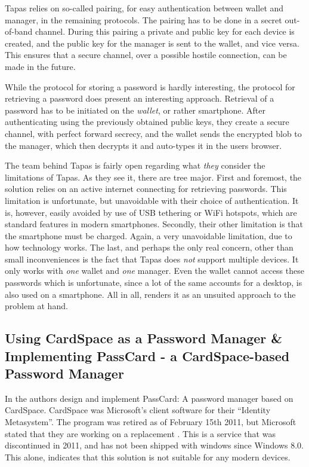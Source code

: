 			Tapas relies on so-called pairing, for easy authentication between wallet and manager, in the remaining protocols. The pairing has to be done in a secret out-of-band channel. During this pairing a private and public key for each device is created, and the public key for the manager is sent to the wallet, and vice versa. This ensures that a secure channel, over a possible hostile connection, can be made in the future.

			While the protocol for storing a password is hardly interesting, the protocol for retrieving a password does present an interesting approach. Retrieval of a password has to be initiated on the \emph{wallet}, or rather smartphone. After authenticating using the previously obtained public keys, they create a secure channel, with perfect forward secrecy, and the wallet sends the encrypted blob to the manager, which then decrypts it and auto-types it in the users browser.

			The team behind Tapas is fairly open regarding what \emph{they} consider the limitations of Tapas. As they see it, there are tree major. First and foremost, the solution relies on an active internet connecting for retrieving passwords. This limitation is unfortunate, but unavoidable with their choice of authentication. It is, however, easily avoided by use of USB tethering or WiFi hotspots, which are standard features in modern smartphones. Secondly, their other limitation is that the smartphone must be charged. Again, a very unavoidable limitation, due to how technology works. The last, and perhaps the only real concern, other than small inconveniences is the fact that Tapas does \emph{not} support multiple devices. It only works with \emph{one} wallet and  \emph{one} manager. Even the wallet cannot access these passwords which is unfortunate, since a lot of the same accounts for a desktop, is also used on a smartphone. All in all, renders it as an unsuited approach to the problem at hand.


		\subsection*{Using CardSpace as a Password Manager \& Implementing PassCard - a CardSpace-based Password Manager}
			In \cite{cardspace,cardspace_impl} the authors design and implement PassCard: A password manager based on CardSpace. CardSpace was Microsoft's client software for their ``Identity Metasystem''. The program was retired as of February 15th 2011, but Microsoft stated that they are working on a replacement \cite{cardspace_cancelled}. This is a service that was discontinued in 2011, and has not been shipped with windows since Windows 8.0. This alone, indicates that this solution is not suitable for any modern devices.

